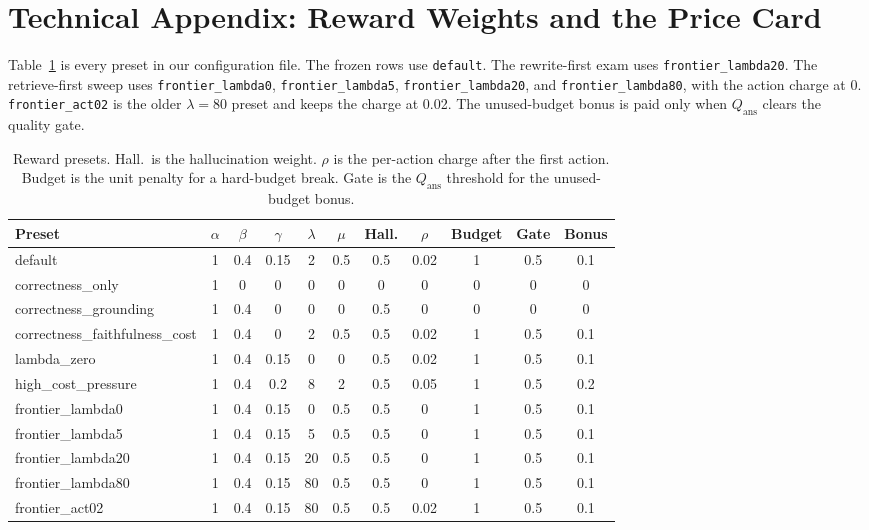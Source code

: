 \documentclass[letterpaper]{article} %
\begin{document}
\FloatBarrier
\begingroup
\raggedright

\endgroup

\appendix
\section{Technical Appendix: Reward Weights and the Price Card}
Table~\ref{tab:presets} is every preset in our configuration file. The frozen rows use \texttt{default}. The rewrite-first exam uses \texttt{frontier\_lambda20}. The retrieve-first sweep uses \texttt{frontier\_lambda0}, \texttt{frontier\_lambda5}, \texttt{frontier\_lambda20}, and \texttt{frontier\_lambda80}, with the action charge at 0. \texttt{frontier\_act02} is the older \(\lambda{=}80\) preset and keeps the charge at 0.02. The unused-budget bonus is paid only when \(Q_{\mathrm{ans}}\) clears the quality gate.

\begin{table}[t]
\centering
\small
\begin{tabular}{lcccccccccc}
\toprule
Preset & \(\alpha\) & \(\beta\) & \(\gamma\) & \(\lambda\) & \(\mu\) & Hall. & \(\rho\) & Budget & Gate & Bonus \\
\midrule
default & 1 & 0.4 & 0.15 & 2 & 0.5 & 0.5 & 0.02 & 1 & 0.5 & 0.1 \\
correctness\_only & 1 & 0 & 0 & 0 & 0 & 0 & 0 & 0 & 0 & 0 \\
correctness\_grounding & 1 & 0.4 & 0 & 0 & 0 & 0.5 & 0 & 0 & 0 & 0 \\
correctness\_faithfulness\_cost & 1 & 0.4 & 0 & 2 & 0.5 & 0.5 & 0.02 & 1 & 0.5 & 0.1 \\
lambda\_zero & 1 & 0.4 & 0.15 & 0 & 0 & 0.5 & 0.02 & 1 & 0.5 & 0.1 \\
high\_cost\_pressure & 1 & 0.4 & 0.2 & 8 & 2 & 0.5 & 0.05 & 1 & 0.5 & 0.2 \\
frontier\_lambda0 & 1 & 0.4 & 0.15 & 0 & 0.5 & 0.5 & 0 & 1 & 0.5 & 0.1 \\
frontier\_lambda5 & 1 & 0.4 & 0.15 & 5 & 0.5 & 0.5 & 0 & 1 & 0.5 & 0.1 \\
frontier\_lambda20 & 1 & 0.4 & 0.15 & 20 & 0.5 & 0.5 & 0 & 1 & 0.5 & 0.1 \\
frontier\_lambda80 & 1 & 0.4 & 0.15 & 80 & 0.5 & 0.5 & 0 & 1 & 0.5 & 0.1 \\
frontier\_act02 & 1 & 0.4 & 0.15 & 80 & 0.5 & 0.5 & 0.02 & 1 & 0.5 & 0.1 \\
\bottomrule
\end{tabular}
\caption{Reward presets. Hall.\ is the hallucination weight. \(\rho\) is the per-action charge after the first action. Budget is the unit penalty for a hard-budget break. Gate is the \(Q_{\mathrm{ans}}\) threshold for the unused-budget bonus.}
\label{tab:presets}
\end{table}
\end{document}
